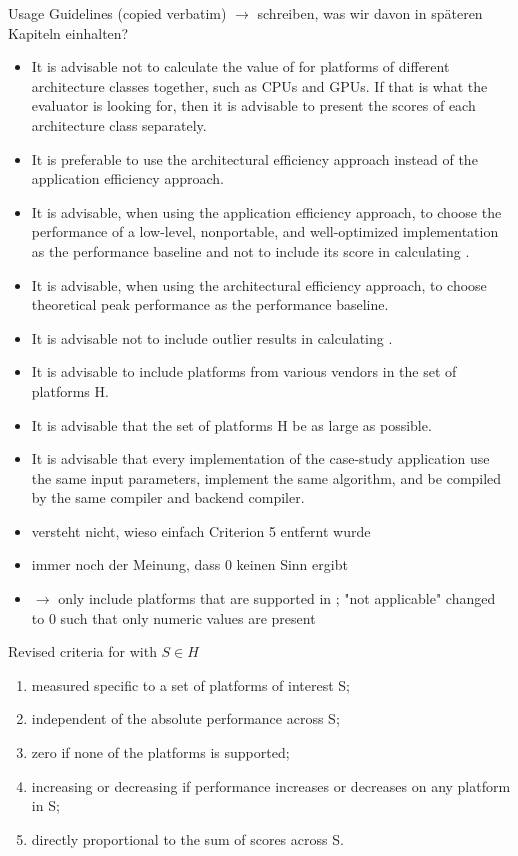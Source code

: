 Usage Guidelines (copied verbatim) $\rightarrow$ schreiben, was wir davon in späteren Kapiteln einhalten?
\begin{itemize}
    \item It is advisable not to calculate the value of \mpp for platforms of different architecture classes together, such as CPUs and GPUs. If that is what the evaluator is looking for, then it is advisable to present the scores of each architecture class separately.
    \item It is preferable to use the architectural efficiency approach instead of the application efficiency approach.
    \item It is advisable, when using the application efficiency approach, to choose the performance of a low-level, nonportable, and well-optimized implementation as the performance baseline and not to include its score in calculating \mpp.
    \item It is advisable, when using the architectural efficiency approach, to choose theoretical peak performance as the performance baseline.
    \item It is advisable not to include outlier results in calculating \mpp.
    \item It is advisable to include platforms from various vendors in the set of platforms H.
    \item It is advisable that the set of platforms H be as large as possible.
    \item It is advisable that every implementation of the case-study application use the same input parameters, implement the same algorithm, and be compiled by the same compiler and backend compiler.
\end{itemize}


\newpage
\cite{marowka_comparison_2023}

\begin{itemize}
    \item versteht nicht, wieso einfach Criterion 5 entfernt wurde
    \item immer noch der Meinung, dass $0$ keinen Sinn ergibt
    \item $\rightarrow$ only include platforms that are supported in \mpp; "not applicable" changed to $0$ such that only numeric values are present
\end{itemize}

Revised criteria for \mpp with $S \in H$
\begin{enumerate}
    \item measured specific to a set of platforms of interest S;
    \item independent of the absolute performance across S;
    \item zero if none of the platforms is supported;
    \item increasing or decreasing if performance increases or decreases on any platform in S;
    \item directly proportional to the sum of scores across S.
\end{enumerate}

